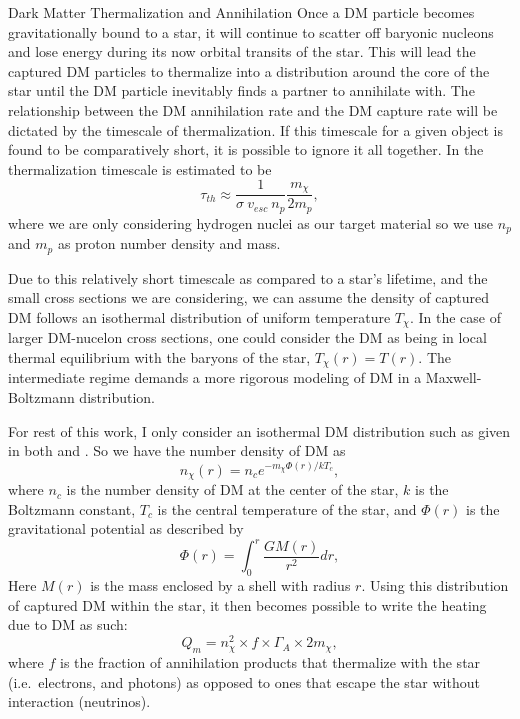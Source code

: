 \documentclass[a4paper,11pt]{article}
\begin{document}
\begin{section}{Dark Matter Thermalization and Annihilation}
    Once a DM particle becomes gravitationally bound to a star, it will continue to scatter off baryonic nucleons and lose energy during its now orbital transits of the star. 
    This will lead the captured DM particles to thermalize into a distribution around the core of the star until the DM particle inevitably finds a partner to annihilate with.
    The relationship between the DM annihilation rate and the DM capture rate will be dictated by the timescale of thermalization.
    If this timescale for a given object is found to be comparatively short, it is possible to ignore it all together.
    In \cite{Freese:2008cap} the thermalization timescale is estimated to be
    \begin{equation}
    \tau_{th} \approx \frac{1}{\sigma~ v_{esc}~ n_p} \frac{m_{\chi}}{2 m_p},
    \end{equation}
    where we are only considering hydrogen nuclei as our target material so we use $n_p$ and $m_p$ as proton number density and mass.

    Due to this relatively short timescale as compared to a star's lifetime, and the small cross sections we are considering, we can assume the density of captured DM follows an isothermal distribution of uniform temperature $T_{\chi}$.
    In the case of larger DM-nucelon cross sections, one could consider the DM as being in local thermal equilibrium with the baryons of the star, $T_{\chi}(r) = T(r)$.
    The intermediate regime demands a more rigorous modeling of DM in a Maxwell-Boltzmann distribution.

    For rest of this work, I only consider an isothermal DM distribution such as given in both \cite{Freese:2008cap} and \cite{Garani:2017}. So we have the number density of DM as
    \begin{equation}
        n_{\chi}(r) =  n_{c} e^{-m_{\chi} \Phi(r)/kT_c },
        \label{nchi}
    \end{equation}
    where $n_{c}$ is the number density of DM at the center of the star, $k$ is the Boltzmann constant, $T_c$ is the central temperature of the star, and $\Phi(r)$ is the gravitational potential as described by
    \begin{equation}
    \Phi(r) = \int_{0}^{r} \frac{GM(r)}{r^2} dr,
    \end{equation}
    Here $M(r)$ is the mass enclosed by a shell with radius $r$.
    Using this distribution of captured DM within the star, it then becomes possible to write the heating due to DM as such:
    \begin{equation}
        Q_m = n_{\chi}^2 \times f \times \Gamma_A \times 2 m_{\chi} ,
    \end{equation}
    where $f$ is the fraction of annihilation products that thermalize with the star (i.e.~electrons, and photons) as opposed to ones that escape the star without interaction (neutrinos). 


\end{section}
\end{document}
